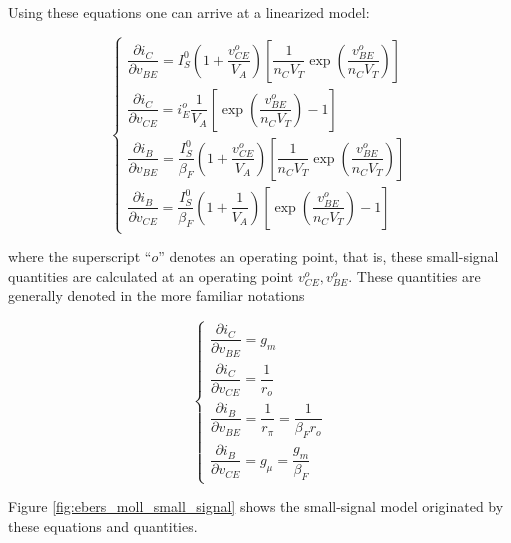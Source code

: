 	Using these equations one can arrive at a linearized model:

\begin{equation}
	\left\{\begin{array}{l}
		\dfrac{\partial i_C}{\partial v_{BE}} = I_{S}^0 \left(1 + \dfrac{v_{CE}^o}{V_A}\right)\left[\dfrac{1}{n_CV_T} \exp\left(\dfrac{v_{BE}^o}{n_CV_T}\right) \right]\\[5mm]
		\dfrac{\partial i_C}{\partial v_{CE}} = i_E^o \dfrac{1}{V_A} \left[\exp\left(\dfrac{v_{BE}^o}{n_CV_T}\right) - 1\right] \\[5mm]
		\dfrac{\partial i_B}{\partial v_{BE}} = \dfrac{I_{S}^0}{\beta_F} \left(1 + \dfrac{v_{CE}^o}{V_A}\right)\left[\dfrac{1}{n_CV_T} \exp\left(\dfrac{v_{BE}^o}{n_CV_T}\right) \right] \\[5mm]
		\dfrac{\partial i_B}{\partial v_{CE}} = \dfrac{I_{S}^0}{\beta_F} \left(1 + \dfrac{1}{V_A}\right)\left[\exp\left(\dfrac{v_{BE}^o}{n_CV_T}\right) - 1\right]
	\end{array}\right.
\end{equation}

	\noindent where the superscript ``$o$'' denotes an operating point, that is, these small-signal quantities are calculated at an operating point $v_{CE}^o, v_{BE}^o$. These quantities are generally denoted in the more familiar notations

\begin{equation}
	\left\{\begin{array}{l}
		\dfrac{\partial i_C}{\partial v_{BE}} = g_m\\[5mm]
		\dfrac{\partial i_C}{\partial v_{CE}} = \dfrac{1}{r_o}\\[5mm]
		\dfrac{\partial i_B}{\partial v_{BE}} = \dfrac{1}{r_\pi} = \dfrac{1}{\beta_F r_o} \\[5mm]
		\dfrac{\partial i_B}{\partial v_{CE}} = g_\mu = \dfrac{g_m}{\beta_F}
	\end{array}\right.
\end{equation}

	Figure \ref{fig:ebers_moll_small_signal} shows the small-signal model originated by these equations and quantities.

